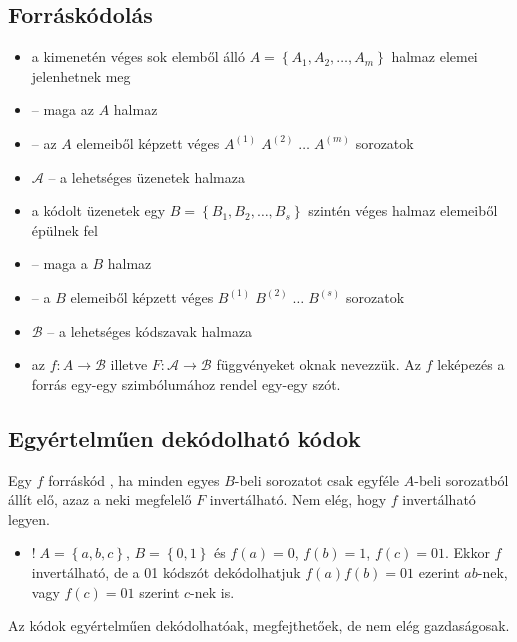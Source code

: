\documentclass[../main.tex]{subfiles}
\begin{document}
\subsection{Forráskódolás}

\begin{itemize}
  \item a  kimenetén véges sok
        elemből álló $A = \left\{ A_1, A_2, \dots, A_m \right\}$ halmaz
        elemei jelenhetnek meg

  \item {} – maga az $A$ halmaz

  \item {} – az $A$ elemeiből képzett véges
        $A^{(1)} \; A^{(2)} \; \dots \; A^{(m)}$ sorozatok

  \item $\mathcal{A}$ – a lehetséges üzenetek halmaza

  \item a kódolt üzenetek egy
        $B = \left\{ B_1, B_2, \dots, B_s \right\}$
        szintén véges halmaz elemeiből épülnek fel

  \item {} – maga a $B$ halmaz

  \item {} – a $B$ elemeiből képzett véges
        $B^{(1)} \; B^{(2)} \; \dots \; B^{(s)}$ sorozatok

  \item $\mathcal{B}$ – a lehetséges kódszavak halmaza

  \item az $f: A \rightarrow \mathcal{B}$ illetve
        $F: \mathcal{A} \rightarrow \mathcal{B}$ függvényeket
        oknak nevezzük. Az $f$ leképezés
        a forrás egy-egy szimbólumához rendel egy-egy szót.
\end{itemize}

\subsection{Egyértelműen dekódolható kódok}

Egy $f$ forráskód ,
ha minden egyes $B$-beli sorozatot csak egyféle
$A$-beli sorozatból állít elő, azaz a neki
megfelelő $F$ invertálható. Nem elég, hogy $f$
invertálható legyen.
\begin{itemize}
  \item $! \; A = \left\{a, b, c\right\}$, $B = \left\{ 0, 1\right\}$
        és $f(a) = 0$, $f(b) = 1$, $f(c) = 01$. Ekkor $f$ invertálható,
        de a 01 kódszót dekódolhatjuk $f(a) f(b) = 01$ ezerint $ab$-nek,
        vagy $f(c)=01$ szerint $c$-nek is.
\end{itemize}
Az 
kódok egyértelműen dekódolhatóak, megfejthetőek,
de nem elég gazdaságosak.
\end{document}
